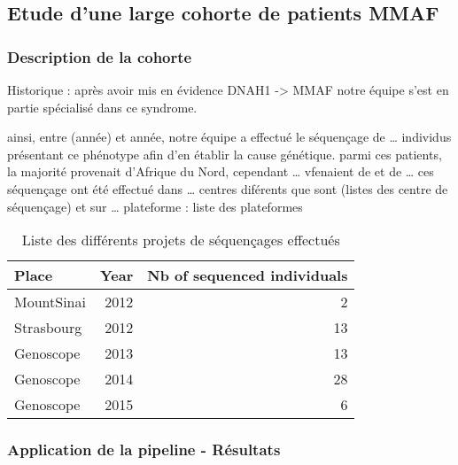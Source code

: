 \documentclass[12pt,twoside]{reedthesis}
\theoremstyle{definition}
\theoremstyle{definition}
\theoremstyle{remark}
\begin{document}
  \newpage
  
  \subsection{Etude d'une large cohorte de patients
  MMAF}\label{cohortemmah}
  
  \subsubsection{Description de la
  cohorte}\label{description-de-la-cohorte}
  
  Historique : après avoir mis en évidence DNAH1 -\textgreater{} MMAF
  notre équipe s'est en partie spécialisé dans ce syndrome.
  
  ainsi, entre (année) et année, notre équipe a effectué le séquençage de
  \ldots{} individus présentant ce phénotype afin d'en établir la cause
  génétique. parmi ces patients, la majorité provenait d'Afrique du Nord,
  cependant \ldots{} vfenaient de et de \ldots{} ces séquençage ont été
  effectué dans \ldots{} centres diférents que sont (listes des centre de
  séquençage) et sur \ldots{} plateforme : liste des plateformes
  
  \begin{longtable}[t]{lrr}
  \caption{\label{tab:tabcohort}Liste des différents projets de séquençages effectués}\\
  \toprule
  Place & Year & Nb of sequenced individuals\\
  \midrule
  MountSinai & 2012 & 2\\
  Strasbourg & 2012 & 13\\
  Genoscope & 2013 & 13\\
  Genoscope & 2014 & 28\\
  Genoscope & 2015 & 6\\
  \bottomrule
  \end{longtable}
  
  \newpage
  
  \subsubsection{Application de la pipeline -
  Résultats}\label{application-de-la-pipeline---resultats}
  
\end{document}
